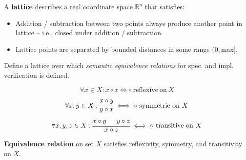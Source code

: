 \documentclass[99-notes-packed.tex]{subfiles}
\begin{document}
\begin{background}[lattice]
    A \textbf{lattice} describes a real coordinate space $\mathbb{R}^n$ that satisfies: 
    \begin{itemize}
        \item {
            Addition / subtraction between two points always produce another point in lattice -- i.e., closed under addition / subtraction.
        }
        \item {
            Lattice points are separated by bounded distances in some range $(0, \mathrm{max}]$.
        }
    \end{itemize}
\end{background}

Define a lattice over which \textit{semantic equivalence relations} for spec. and impl. verification is defined.

\begin{background}[reflexivity]
    \begin{equation*}
        \forall x \in X: x \circ x \iff \circ\ \mathrm{reflexive\ on}\ X
    \end{equation*}
\end{background}

\begin{background}[symmetry]
    \begin{equation*}
        \forall x, y \in X:
        \begin{prooftree}
            \hypo{x \circ y}
            \infer1{y \circ x}
        \end{prooftree}
        \iff \circ\ \mathrm{symmetric\ on}\ X
    \end{equation*}
\end{background}

\begin{background}[transitivity]
    \begin{equation*}
        \forall x, y, z \in X: 
        \begin{prooftree}
            \hypo{x \circ y}
            \hypo{y \circ z}
            \infer2{x \circ z}
        \end{prooftree}
        \iff \circ\ \mathrm{transitive\ on}\ X
    \end{equation*}
\end{background}

\begin{background}
    \textbf{Equivalence relation} on set $X$ satisfies reflexivity, symmetry, and transitivity on $X$.
\end{background}
\end{document}
